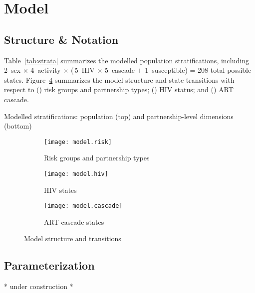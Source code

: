 \section{Model}\label{a:model}
\subsection{Structure \& Notation}\label{a:model.struc}
Table~\ref{tab:strata} summarizes the modelled population stratifications,
including 2~sex $\times$ 4~activity $\times$ (\,5~HIV $\times$ 5~cascade $+$ 1~susceptible)
= 208 total possible states.
Figure~\ref{fig:model} summarizes the model structure and state transitions with respect to
() risk groups and partnership types;
() HIV status; and
() ART cascade.
\begin{table}[h]
  \centering
  \caption{Modelled stratifications: population (top) and partnership-level dimensions (bottom)}
  
  \label{tab:strata}
\end{table}
\begin{figure}[h]
  \begin{subfigure}{\linewidth}
    \texttt{[image: model.risk]}
    \caption{Risk groups and partnership types}
    \label{fig:model.risk}
  \end{subfigure}
  \begin{subfigure}{\linewidth}
    \texttt{[image: model.hiv]}
    \caption{HIV states}
    \label{fig:model.hiv}
  \end{subfigure}
  \begin{subfigure}{\linewidth}
    \texttt{[image: model.cascade]}
    \caption{ART cascade states}
    \label{fig:model.care}
  \end{subfigure}
  \caption{Model structure and transitions}
  \label{fig:model}
\end{figure}
\subsection{Parameterization}\label{a:model.param}
* under construction *
\clearpage{}
